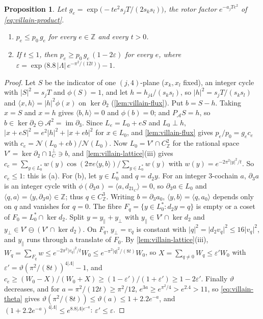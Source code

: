 \documentclass[11pt,a4paper]{amsart}
\newtheorem{proposition}[theorem]{Proposition}
\theoremstyle{definition}
\theoremstyle{remark}
\numberwithin{equation}{section}
\newcommand{\Z}{\mathbb{Z}}          %
\newcommand{\ip}[2]{\langle #1,#2\rangle}  %
\newcommand{\abs}[1]{\lvert #1\rvert}      %
\begin{document}
\begin{proposition}\label{prop:villain-weights}
Let $g_e=\exp\bigl(-te^2s_jT/(2s_ks_l)\bigr)$, the rotor factor $e^{-a_jTe^2}$ of \eqref{eq:villain-product}.
\begin{enumerate}[label=(\alph*),leftmargin=2.2em]
\item $p_e\le p_0\,g_e$ for every $e\in\Z$ and every $t>0$.
\item If $t\le1$, then $p_e\ge p_0\,g_e\,(1-2\varepsilon)$ for every $e$, where $\varepsilon=\exp\bigl(8.8\,|\Lambda|\,e^{-\pi^2/(12t)}\bigr)-1$.
\end{enumerate}
\end{proposition}

\begin{proof}
Let $S$ be the indicator of one $(j,4)$-plane ($x_k,x_l$ fixed), an integer cycle with $\abs S^2=s_jT$ and $\phi(S)=1$, and let $h=h_{j4}/(s_ks_l)$, so $\abs h^2=s_jT/(s_ks_l)$ and $\ip xh=\abs h^2\phi(x)$ on $\ker\partial_2$ (\cref{lem:villain-flux}). Put $b=S-h$. Taking $x=S$ and $x=h$ gives $\ip bh=0$ and $\phi(b)=0$; and $P_{\mathcal A}S=h$, so $b\in\ker\partial_2\ominus\mathcal A^2=\operatorname{im}\partial_3$. Since $L_e=L_0+eS$ and $L_0\perp h$, $\abs{x+eS}^2=e^2\abs h^2+\abs{x+eb}^2$ for $x\in L_0$, and \cref{lem:villain-flux} gives $p_e/p_0=g_ec_e$ with $c_e=\mathcal N(L_0+eb)/\mathcal N(L_0)$. Now $L_0=V'\cap C^2_\Z$ for the rational space $V'=\ker\partial_2\cap1_C^\perp\ni b$, and \cref{lem:villain-lattice}(iii) gives $c_e=\sum_{y\in L_0^*}w(y)\cos(2\pi e\ip yb)\big/\sum_{y\in L_0^*}w(y)$ with $w(y)=e^{-2\pi^2\abs y^2/t}$. So $c_e\le1$: this is (a). For (b), let $y\in L_0^*$ and $q=d_2y$. For an integer $3$-cochain $a$, $\partial_3a$ is an integer cycle with $\phi(\partial_3a)=\ip a{d_21_C}=0$, so $\partial_3a\in L_0$ and $\ip qa=\ip y{\partial_3a}\in\Z$; thus $q\in C^3_\Z$. Writing $b=\partial_3a_0$, $\ip yb=\ip q{a_0}$ depends only on $q$ and vanishes for $q=0$. The fibre $F_q=\{y\in L_0^*:d_2y=q\}$ is empty or a coset of $F_0=L_0^*\cap\ker d_2$. Split $y=y_\parallel+y_\perp$ with $y_\parallel\in V'\cap\ker d_2$ and $y_\perp\in V'\ominus(V'\cap\ker d_2)$. On $F_q$, $y_\perp=v_q$ is constant with $\abs q^2=\abs{d_2v_q}^2\le16\abs{v_q}^2$, and $y_\parallel$ runs through a translate of $F_0$. By \cref{lem:villain-lattice}(iii), $W_q=\sum_{F_q}w\le e^{-2\pi^2\abs{v_q}^2/t}W_0\le e^{-\pi^2\abs q^2/(8t)}W_0$, so $X=\sum_{q\ne0}W_q\le\varepsilon'W_0$ with $\varepsilon'=\vartheta(\pi^2/(8t))^{4|\Lambda|}-1$, and $c_e\ge(W_0-X)/(W_0+X)\ge(1-\varepsilon')/(1+\varepsilon')\ge1-2\varepsilon'$. Finally $\vartheta$ decreases, and for $a=\pi^2/(12t)\ge\pi^2/12$, $e^{3a}\ge e^{\pi^2/4}>e^{2.4}>11$, so \eqref{eq:villain-theta} gives $\vartheta(\pi^2/(8t))\le\vartheta(a)\le1+2.2e^{-a}$, and $(1+2.2e^{-a})^{4|\Lambda|}\le e^{8.8|\Lambda|e^{-a}}$: $\varepsilon'\le\varepsilon$.
\end{proof}
\end{document}
